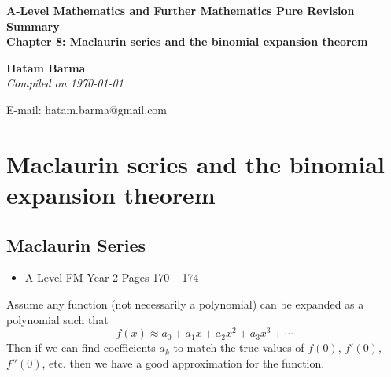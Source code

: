 \documentclass[11pt, a4paper]{article}
\begin{document}
\begin{titlepage}
   \begin{center}
       \vspace*{2.5cm}
	\huge
       \textbf{A-Level Mathematics and Further Mathematics Pure Revision Summary} \\
	\vspace{1cm}
	\Large
       \textbf{Chapter 8: Maclaurin series and the binomial expansion theorem}
            
       \vspace{1.5cm}
	\LARGE
       \textbf{Hatam Barma} \\
	\vspace{0.75cm}
       \normalsize
       \emph{Compiled on \Datea\today} \\

       \vfill
        

	E-mail: hatam.barma@gmail.com
   \end{center}
\end{titlepage}


\tableofcontents

\clearpage
\section{Maclaurin series and the binomial expansion theorem}
\vspace{0.5cm}


\subsection{Maclaurin Series}
\begin{itemize}
\item A Level FM Year 2 \hspace{1cm} \phantom{AS /} Pages 170 -- 174
\end{itemize} \par
Assume any function (not necessarily a polynomial) can be expanded as a polynomial such that
\begin{equation*}
f(x)\approx a_{0}+a_{1}x+a_{2}x^{2}+a_{3}x^{3}+\cdots
\end{equation*}
Then if we can find coefficients $a_{k}$ to match the true values of $f(0)$, $f'(0)$, $f''(0)$, etc. then we have a good approximation for the function.
\end{document}
